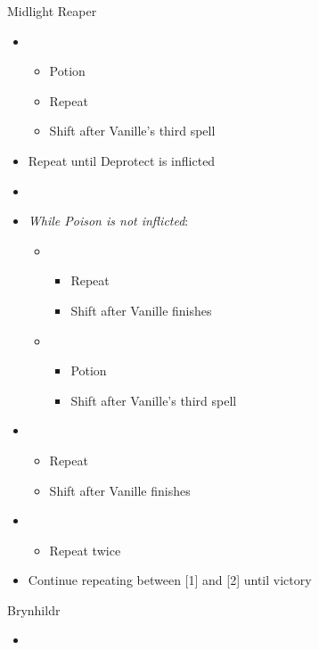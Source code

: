 \begin{paracol}{2}
\begin{battle}{Midlight Reaper}
\begin{itemize}
\begin{itemize}
			      \end{itemize}
			\item \sixth
			      \begin{itemize}
				      \item Potion
				      \item Repeat
				      \item Shift after Vanille's third spell
			      \end{itemize}
			\item Repeat until Deprotect is inflicted
			\item \stagger
			\item \textit{While Poison is not inflicted}:
			      \begin{itemize}
				      \item \first
				            \begin{itemize}
					            \item Repeat
					            \item Shift after Vanille finishes
				            \end{itemize}
				      \item \sixth
				            \begin{itemize}
					            \item Potion
					            \item Shift after Vanille's third spell
				            \end{itemize}
			      \end{itemize}
			\item \first
			      \begin{itemize}
				      \item Repeat
				      \item Shift after Vanille finishes
			      \end{itemize}
			\item \second
			      \begin{itemize}
				      \item Repeat twice
			      \end{itemize}
			\item Continue repeating between [1] and [2] until victory
		\end{itemize}
	\end{battle}
	\switchcolumn*
	\begin{battle}{Brynhildr}
		\begin{itemize}
			\item \first
			      \begin{itemize}

\end{itemize}
\end{itemize}
\end{battle}
\end{paracol}
